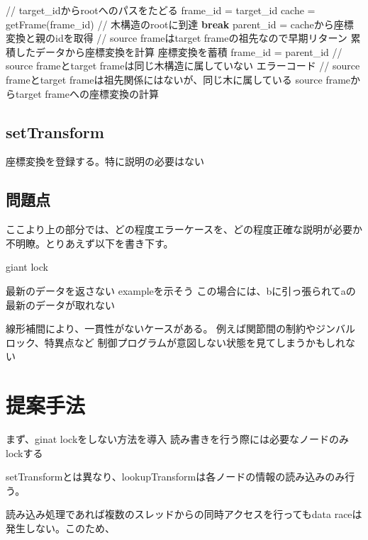 \documentclass{jarticle}
\begin{document}
\begin{multicols}{2}
\begin{algorithm}[H]
\begin{algorithmic}
	\STATE // target\_idからrootへのパスをたどる
	\STATE frame\_id = target\_id
	\STATE cache = getFrame(frame\_id)
	\STATE // 木構造のrootに到達
	\STATE \textbf{break}
	\ENDIF
	\STATE parent\_id = cacheから座標変換と親のidを取得
	\STATE // source frameはtarget frameの祖先なので早期リターン
	\STATE 累積したデータから座標変換を計算
	\ENDIF
	\STATE 座標変換を蓄積
	\STATE frame\_id = parent\_id
	\ENDWHILE
	\STATE // source frameとtarget frameは同じ木構造に属していない
	\RETURN エラーコード
	\ENDIF
	\STATE // source frameとtarget frameは祖先関係にはないが、同じ木に属している
	\STATE source frameからtarget frameへの座標変換の計算
	\end{algorithmic}
\end{algorithm}




\subsection{setTransform}

座標変換を登録する。特に説明の必要はない

\subsection{問題点}

ここより上の部分では、どの程度エラーケースを、どの程度正確な説明が必要か不明瞭。とりあえず以下を書き下す。

giant lock

最新のデータを返さない
exampleを示そう
%
この場合には、bに引っ張られてaの最新のデータが取れない

線形補間により、一貫性がないケースがある。
例えば関節間の制約やジンバルロック、特異点など
制御プログラムが意図しない状態を見てしまうかもしれない

\section{提案手法}

まず、ginat lockをしない方法を導入
読み書きを行う際には必要なノードのみlockする

setTransformとは異なり、lookupTransformは各ノードの情報の読み込みのみ行う。

読み込み処理であれば複数のスレッドからの同時アクセスを行ってもdata raceは発生しない。このため、



\end{multicols}
\end{document}
